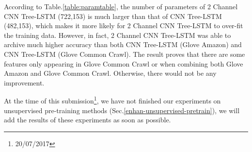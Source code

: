 According to Table.\ref{table:paramtable}, the number of parameters of 2 Channel CNN Tree-LSTM (722,153) is much larger than that of CNN Tree-LSTM (482,153), which makes it more likely for 2 Channel CNN Tree-LSTM to over-fit the training data.
However, in fact, 2 Channel CNN Tree-LSTM was able to archive much higher accuracy than both CNN Tree-LSTM (Glove Amazon) and CNN Tree-LSTM (Glove Common Crawl).\label{proved:Common-syn-Amazon}
The result proves that there are some features only appearing in Glove Common Crawl or when combining both Glove Amazon and Glove Common Crawl.
Otherwise, there would not be any improvement.

At the time of this submission\footnote{20/07/2017}, we have not finished our experiments on unsupervised pre-training methods (Sec.\ref{enhan-unsupervised-pretrain}), we will add the results of these experiments as soon as possible.

